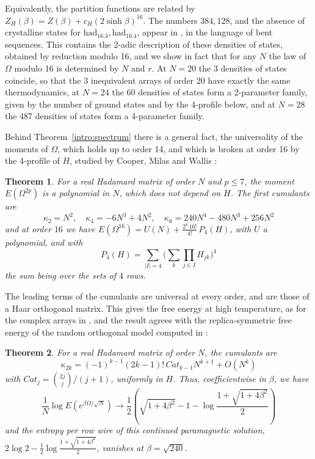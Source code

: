\documentclass[11pt,a4paper]{article}
\newtheorem{introthm}{Theorem}
\theoremstyle{remark}
\begin{document}
Equivalently, the partition functions are related by $Z_H(\beta)=Z(\beta)+c_H(2\sinh\beta)^{16}$. The numbers $384,128$, and the absence of crystalline states for $\mathrm{had}_{16.3},\mathrm{had}_{16.4}$, appear in \cite{scg}, in the language of bent sequences. This contains the 2-adic description of these densities of states, obtained by reduction modulo 16, and we show in fact that for any $N$ the law of $\Omega$ modulo 16 is determined by $N$ and $r$. At $N=20$ the 3 densities of states coincide, so that the 3 inequivalent arrays of order 20 have exactly the same thermodynamics, at $N=24$ the 60 densities of states form a 2-parameter family, given by the number of ground states and by the 4-profile below, and at $N=28$ the 487 densities of states form a 4-parameter family.

Behind Theorem~\ref{intro:spectrum} there is a general fact, the universality of the moments of $\Omega$, which holds up to order 14, and which is broken at order 16 by the 4-profile of $H$, studied by Cooper, Milas and Wallis \cite{cmw}:

\begin{samepage}
\begin{introthm}\label{intro:moments}
For a real Hadamard matrix of order $N$ and $p\leq7$, the moment $E(\Omega^{2p})$ is a polynomial in $N$, which does not depend on $H$. The first cumulants are
\[
 \kappa_2=N^2,\quad\kappa_4=-6N^3+4N^2,\quad\kappa_6=240N^4-480N^3+256N^2
\]
and at order $16$ we have $E(\Omega^{16})=U(N)+\frac{2^8\,16!}{4!}\,P_4(H)$, with $U$ a polynomial, and with
\[
 P_4(H)=\sum_{|I|=4}\Big(\sum_k\prod_{j\in I}H_{jk}\Big)^4
\]
the sum being over the sets of $4$ rows.
\end{introthm}
\end{samepage}

The leading terms of the cumulants are universal at every order, and are those of a Haar orthogonal matrix. This gives the free energy at high temperature, as for the complex arrays in \cite{cot}, and the result agrees with the replica-symmetric free energy of the random orthogonal model computed in \cite{mp2}:

\begin{samepage}
\begin{introthm}\label{intro:free}
For a real Hadamard matrix of order $N$, the cumulants are
\[
 \kappa_{2k}=(-1)^{k-1}(2k-1)!\,Cat_{k-1}N^{k+1}+O(N^k)
\]
with $Cat_j=\binom{2j}{j}/(j+1)$, uniformly in $H$. Thus, coefficientwise in $\beta$, we have
\[
 \frac{1}{N}\log E\left(e^{\beta\Omega/\sqrt N}\right)\to\frac{1}{2}\left(\sqrt{1+4\beta^2}-1-\log\frac{1+\sqrt{1+4\beta^2}}{2}\right)
\]
and the entropy per row wire of this continued paramagnetic solution, $2\log2-\frac{1}{2}\log\frac{1+\sqrt{1+4\beta^2}}{2}$, vanishes at $\beta=\sqrt{240}$.
\end{introthm}
\end{samepage}
\end{document}
